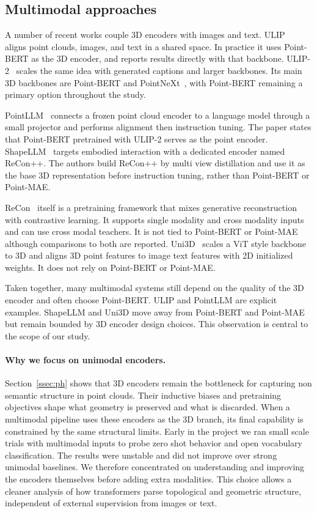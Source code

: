 \subsection{Multimodal approaches}
\label{ssec:multimodal}

A number of recent works couple 3D encoders with images and text. ULIP~\cite{ulip} aligns point clouds, images, and text in a shared space. In practice it uses Point-BERT as the 3D encoder, and reports results directly with that backbone. ULIP-2~\cite{ulip2} scales the same idea with generated captions and larger backbones. Its main 3D backbones are Point-BERT and PointNeXt~\cite{pointnext}, with Point-BERT remaining a primary option throughout the study.

PointLLM~\cite{pointllm} connects a frozen point cloud encoder to a language model through a small projector and performs alignment then instruction tuning. The paper states that Point-BERT pretrained with ULIP-2 serves as the point encoder. ShapeLLM~\cite{shapellm} targets embodied interaction with a dedicated encoder named ReCon++. The authors build ReCon++ by multi view distillation and use it as the base 3D representation before instruction tuning, rather than Point-BERT or Point-MAE.

ReCon~\cite{recon} itself is a pretraining framework that mixes generative reconstruction with contrastive learning. It supports single modality and cross modality inputs and can use cross modal teachers. It is not tied to Point-BERT or Point-MAE although comparisons to both are reported. Uni3D~\cite{uni3d} scales a ViT style backbone to 3D and aligns 3D point features to image text features with 2D initialized weights. It does not rely on Point-BERT or Point-MAE.

Taken together, many multimodal systems still depend on the quality of the 3D encoder and often choose Point-BERT. ULIP and PointLLM are explicit examples. ShapeLLM and Uni3D move away from Point-BERT and Point-MAE but remain bounded by 3D encoder design choices. This observation is central to the scope of our study.

\paragraph{Why we focus on unimodal encoders.} Section~\ref{ssec:ph} shows that 3D encoders remain the bottleneck for capturing non semantic structure in point clouds. Their inductive biases and pretraining objectives shape what geometry is preserved and what is discarded. When a multimodal pipeline uses these encoders as the 3D branch, its final capability is constrained by the same structural limits. Early in the project we ran small scale trials with multimodal inputs to probe zero shot behavior and open vocabulary classification. The results were unstable and did not improve over strong unimodal baselines. We therefore concentrated on understanding and improving the encoders themselves before adding extra modalities. This choice allows a cleaner analysis of how transformers parse topological and geometric structure, independent of external supervision from images or text.